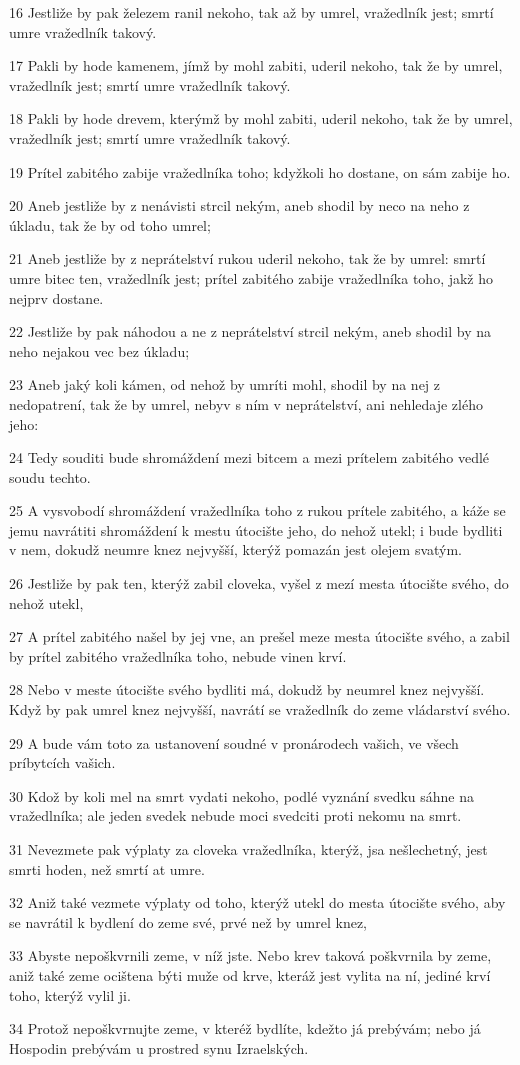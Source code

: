\par 16 Jestliže by pak železem ranil nekoho, tak až by umrel, vražedlník jest; smrtí umre vražedlník takový.
\par 17 Pakli by hode kamenem, jímž by mohl zabiti, uderil nekoho, tak že by umrel, vražedlník jest; smrtí umre vražedlník takový.
\par 18 Pakli by hode drevem, kterýmž by mohl zabiti, uderil nekoho, tak že by umrel, vražedlník jest; smrtí umre vražedlník takový.
\par 19 Prítel zabitého zabije vražedlníka toho; kdyžkoli ho dostane, on sám zabije ho.
\par 20 Aneb jestliže by z nenávisti strcil nekým, aneb shodil by neco na neho z úkladu, tak že by od toho umrel;
\par 21 Aneb jestliže by z neprátelství rukou uderil nekoho, tak že by umrel: smrtí umre bitec ten, vražedlník jest; prítel zabitého zabije vražedlníka toho, jakž ho nejprv dostane.
\par 22 Jestliže by pak náhodou a ne z neprátelství strcil nekým, aneb shodil by na neho nejakou vec bez úkladu;
\par 23 Aneb jaký koli kámen, od nehož by umríti mohl, shodil by na nej z nedopatrení, tak že by umrel, nebyv s ním v neprátelství, ani nehledaje zlého jeho:
\par 24 Tedy souditi bude shromáždení mezi bitcem a mezi prítelem zabitého vedlé soudu techto.
\par 25 A vysvobodí shromáždení vražedlníka toho z rukou prítele zabitého, a káže se jemu navrátiti shromáždení k mestu útocište jeho, do nehož utekl; i bude bydliti v nem, dokudž neumre knez nejvyšší, kterýž pomazán jest olejem svatým.
\par 26 Jestliže by pak ten, kterýž zabil cloveka, vyšel z mezí mesta útocište svého, do nehož utekl,
\par 27 A prítel zabitého našel by jej vne, an prešel meze mesta útocište svého, a zabil by prítel zabitého vražedlníka toho, nebude vinen krví.
\par 28 Nebo v meste útocište svého bydliti má, dokudž by neumrel knez nejvyšší. Když by pak umrel knez nejvyšší, navrátí se vražedlník do zeme vládarství svého.
\par 29 A bude vám toto za ustanovení soudné v pronárodech vašich, ve všech príbytcích vašich.
\par 30 Kdož by koli mel na smrt vydati nekoho, podlé vyznání svedku sáhne na vražedlníka; ale jeden svedek nebude moci svedciti proti nekomu na smrt.
\par 31 Nevezmete pak výplaty za cloveka vražedlníka, kterýž, jsa nešlechetný, jest smrti hoden, než smrtí at umre.
\par 32 Aniž také vezmete výplaty od toho, kterýž utekl do mesta útocište svého, aby se navrátil k bydlení do zeme své, prvé než by umrel knez,
\par 33 Abyste nepoškvrnili zeme, v níž jste. Nebo krev taková poškvrnila by zeme, aniž také zeme ocištena býti muže od krve, kteráž jest vylita na ní, jediné krví toho, kterýž vylil ji.
\par 34 Protož nepoškvrnujte zeme, v kteréž bydlíte, kdežto já prebývám; nebo já Hospodin prebývám u prostred synu Izraelských.

